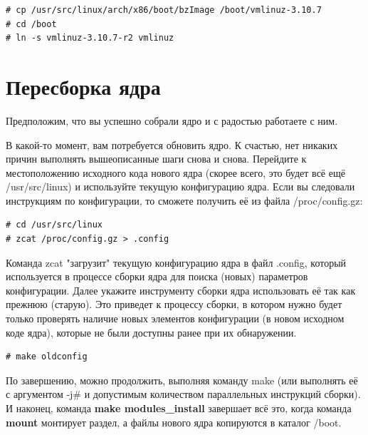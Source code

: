 \documentclass[10pt]{book}
\begin{document}
\vspace{3mm}
\begin{tcolorbox}
\begin{lstlisting}
# cp /usr/src/linux/arch/x86/boot/bzImage /boot/vmlinuz-3.10.7
# cd /boot
# ln -s vmlinuz-3.10.7-r2 vmlinuz
\end{lstlisting}
\end{tcolorbox}

\section{Пересборка ядра}

Предположим, что вы успешно собрали ядро и с радостью работаете с ним. 

В какой-то момент, вам потребуется обновить ядро. К счастью, нет никаких причин выполнять вышеописанные шаги снова и снова. Перейдите к местоположению исходного кода нового ядра (скорее всего, это будет всё ещё /usr/src/linux) и используйте текущую конфигурацию ядра. Если вы следовали инструкциям по конфигурации, то сможете получить её из файла  /proc/config.gz:

\vspace{3mm}
\begin{tcolorbox}
\begin{lstlisting}
# cd /usr/src/linux
# zcat /proc/config.gz > .config
\end{lstlisting}
\end{tcolorbox}

Команда zcat "загрузит" текущую конфигурацию ядра в файл .config, который используется в процессе сборки ядра для поиска (новых) параметров конфигурации. Далее укажите инструменту сборки ядра использовать её так как прежнюю (старую). Это приведет к процессу сборки, в котором нужно будет только проверять наличие новых элементов конфигурации (в новом исходном коде ядра), которые не были доступны ранее при их обнаружении.

\vspace{3mm}
\begin{tcolorbox}
\begin{lstlisting}
# make oldconfig
\end{lstlisting}
\end{tcolorbox}

По завершению, можно продолжить, выполняя команду make (или выполнять её с аргументом -j\# и допустимым количеством параллельных инструкций сборки). И наконец, команда \textbf{make modules\_install} завершает всё это, когда команда \textbf{mount} монтирует раздел, а файлы нового ядра копируются в каталог /boot.
\end{document}
